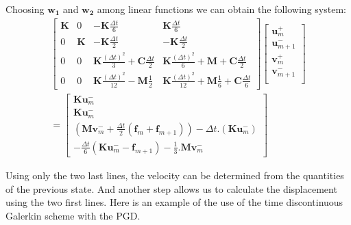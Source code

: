 \documentclass[12pt,a4paper]{article}
\begin{document}
Choosing $\mathbf{w_1}$ and $\mathbf{w_2}$ among linear functions we can obtain the following system:
\begin{equation}
\begin{array}{c}
		\begin{bmatrix}   
		   		\mathbf{K}
			&
		   		0
		   	&
			   	-\mathbf{K} \frac{\Delta t}{6} 
		   	&
		   		\mathbf{K} \frac{\Delta t}{6} 
		\\ 	     
			   0 
			&
				\mathbf{K} 
		   	&
		   		-\mathbf{K} \frac{\Delta t}{2} 
		   	&
		   		-\mathbf{K} \frac{\Delta t}{2}
		\\   
		   		0
		   	& 
		   		0
		   	&
			   	\mathbf{K}
			   		\frac{(\Delta t)^2}{3} 
		   		+\mathbf{C} \frac{\Delta t}{2}
		   	&
		   		\mathbf{K} \frac{(\Delta t)^2}{6} 
		   		+\mathbf{M} 
			   	+\mathbf{C} \frac{\Delta t}{2}
		\\    
		   		0
		   	&
		   		0
		   	&
		   		\mathbf{K} \frac{(\Delta t)^2}{12}
		   		-\mathbf{M}
			   		\frac{1}{2} 
		   	&
		   		\mathbf{K} \frac{(\Delta t)^2}{12}
		   		+\mathbf{M} \frac{1}{6} 
			   +\mathbf{C} \frac{\Delta t}{6} 
	\end{bmatrix}
	\begin{bmatrix}
		   \mathbf{u}_m^+  		\\
		   \mathbf{u}_{m+1}^-  	\\
		   \mathbf{v}_m^+  		\\
		   \mathbf{v}_{m+1}^-  	\\
	\end{bmatrix}
	\\ =
	\begin{bmatrix}	
		  \mathbf{K} \mathbf{u}_m^-
		\\ \mathbf{K} \mathbf{u}_m^-
		\\ 	\left( \mathbf{M} \mathbf{v}_m^-
		     			+\frac{\Delta t}{2}  (\mathbf{f}_m + \mathbf{f}_{m+1})
			  \right)
			-\Delta t.
			 \left( \mathbf{K} \mathbf{u}_m^-
			  \right)
		\\-\frac{\Delta t}{6}
				\left( \mathbf{K} \mathbf{u}_m^- 
						-\mathbf{f}_{m+1}
				\right)
					  
			- \frac{1}{3} .  \mathbf{M} \mathbf{v}_m^-
	\end{bmatrix}
\end{array}
\end{equation}

Using only the two last lines, the velocity can be determined from the quantities of the previous state. And another step allows us to calculate the displacement using the two first lines. Here \cite{boucinha2013space} is an example of the use of the time discontinuous Galerkin scheme with the PGD.
\end{document}
